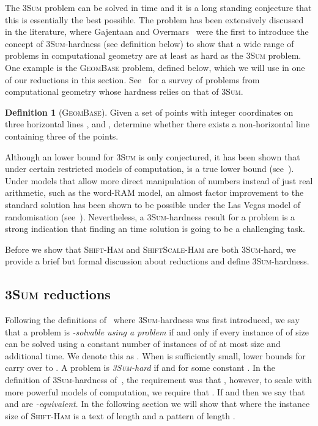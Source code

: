 \documentclass[11pt]{article}
\newcommand{\sHam}{\textsc{Shift-Ham}\xspace}
\newcommand{\ssHam}{\textsc{ShiftScale-Ham}\xspace}
\newcommand{\threeSUM}{\textsc{3Sum}\xspace}
\newcommand{\geombase}{\textsc{GeomBase}\xspace}
\theoremstyle{plain}
\theoremstyle{definition}
\newtheorem{definition}[theorem]{Definition}
\begin{document}
The \threeSUM problem can be solved in  time and it is a long standing conjecture that this is essentially the best possible. The problem has been extensively discussed in the literature, where Gajentaan and Overmars~\cite{GO:1995} were the first to introduce the concept of \threeSUM-hardness (see definition below) to show that a wide range of problems in computational geometry are at least as hard as the \threeSUM problem. One example is the \geombase problem, defined below, which we will use in one of our reductions in this section. See~\cite{King:2004} for a survey of problems from computational geometry whose hardness relies on that of \threeSUM.

\begin{definition}[\geombase]
    \label{def:geombase}
    Given a set of  points with integer coordinates on three horizontal lines ,  and , determine whether there exists a non-horizontal line containing three of the points.
\end{definition}

Although an  lower bound for \threeSUM is only conjectured, it has been shown that under certain restricted models of computation,  is a true lower bound (see~\cite{ES:1995,Erickson:1999,Erickson:convex:1999}). Under models that allow more direct manipulation of numbers instead of just real arithmetic, such as the word-RAM model, an almost  factor improvement to the standard  solution has been shown to be possible under the Las Vegas model of randomisation (see~\cite{BDP:2005}). Nevertheless, a \threeSUM-hardness result for a problem is a strong indication that finding an  time solution is going to be a challenging task.

Before we show that \sHam and \ssHam are both \threeSUM-hard, we provide a brief but formal discussion about reductions and define \threeSUM-hardness.


\subsection{\threeSUM reductions}

Following the definitions of~\cite{GO:1995} where \threeSUM-hardness was first introduced, we say that a problem  is \emph{-solvable using a problem } if and only if every instance of  of size  can be solved using a constant number of instances of  of at most  size and  additional time. We denote this as . When  is sufficiently small, lower bounds for  carry over to . A problem  is \emph{\threeSUM-hard} if  and  for some constant . In the definition of \threeSUM-hardness of~\cite{GO:1995}, the requirement was that , however, to scale with more powerful models of computation, we require that . If  and  then we say that  and  are \emph{-equivalent}.
In the following section we will show that  where the instance size of \sHam is a text of length  and a pattern of length .
\end{document}
